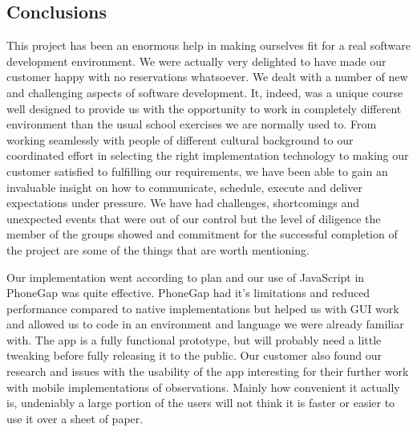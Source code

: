 \subsection{Conclusions}
This project has been an enormous help in making ourselves fit for a real software development environment. We were actually very delighted to have made our customer happy with no reservations whatsoever. We dealt with a number of new and challenging aspects of software development. It, indeed, was a unique course well designed to provide us with the opportunity to work in completely different environment than the usual school exercises we are normally used to. From working seamlessly with people of different cultural background to our coordinated effort in selecting the right implementation technology to making our customer satisfied to fulfilling our requirements, we have been able to gain an invaluable insight on how to communicate, schedule, execute and deliver expectations under pressure. We have had challenges, shortcomings and unexpected events that were out of our control but the level of diligence the member of the groups showed and commitment for the successful completion of the project are some of the things that are worth mentioning.

Our implementation went according to plan and our use of JavaScript in PhoneGap was quite effective.
PhoneGap had it's limitations and reduced performance compared to native implementations but helped us with GUI work and allowed us to code in an environment and language we were already familiar with.
The app is a fully functional prototype, but will probably need a little tweaking before fully releasing it to the public.
Our customer also found our research and issues with the usability of the app interesting for their further work with mobile implementations of observations.
Mainly how convenient it actually is, undeniably a large portion of the users will not think it is faster or easier to use it over a sheet of paper.
